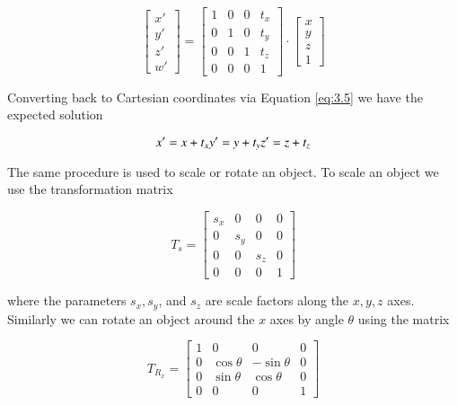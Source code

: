 \begin{equation}\label{eq:3.7}
\left[\begin{array}{c}
x'      \\
y'       \\
z'      \\
w'
\end{array}\right] =\left[\begin{array}{cccc}
1 & 0 & 0 & t_x       \\
0 & 1 & 0 & t_y       \\
0 & 0 & 1 & t_z      \\
0 & 0 & 0 & 1
\end{array}\right] \cdot
\left[\begin{array}{c}
x      \\
y       \\
z      \\
1
\end{array}\right] 
\end{equation}

Converting back to Cartesian coordinates via Equation \ref{eq:3.5} we have the expected solution

\begin{equation}\label{eq:3.8}
x' = x +t_x \\
y' = y + t_y \\
z' = z + t_z
\end{equation}

The same procedure is used to scale or rotate an object. To scale an object we use the transformation matrix

\begin{equation}\label{eq:3.9}
T_s = \left[\begin{array}{cccc}
s_x & 0 & 0 & 0 \\
0 & s_y & 0 & 0 \\
0 & 0 & s_z & 0 \\
0 & 0 & 0 & 1
\end{array}\right]
\end{equation}


where the parameters $s_x, s_y$, and $s_z$ are scale factors along the $x, y, z$ axes. Similarly we can rotate an object around the $x$ axes by angle $\theta$ using the matrix

\begin{equation}\label{eq:3.10}
T_{R_x} = \left[\begin{array}{cccc}
1 & 0 & 0 & 0 \\
0 & \cos\theta & -\sin\theta & 0 \\
0 & \sin\theta & \cos\theta & 0 \\
0 & 0 & 0 & 1
\end{array}\right]
\end{equation}


